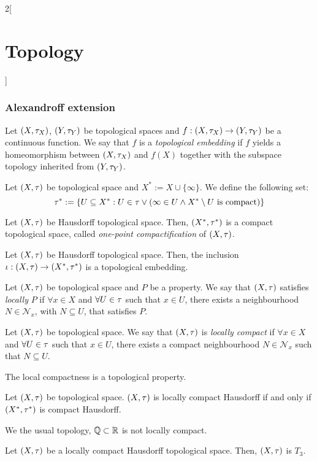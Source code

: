 \documentclass[../../../main.tex]{subfiles}
\begin{document}
\begin{multicols}{2}[\section{Topology}]
  \subsubsection{Alexandroff extension}
  \begin{definition}
    Let $(X,\tau_X)$, $(Y,\tau_Y)$ be topological spaces and $f:(X,\tau_X)\rightarrow(Y,\tau_Y)$ be a continuous function. We say that $f$ is a \emph{topological embedding} if $f$ yields a homeomorphism between $(X,\tau_X)$ and $f(X)$ together with the subspace topology inherited from $(Y,\tau_Y)$.
  \end{definition}
  \begin{definition}
    Let $(X,\tau)$ be topological space and $X^*:=X\cup\{\infty\}$. We define the following set:
    $$\tau^*:=\{U\subseteq X^*:U\in\tau\lor(\infty\in U\land X^*\setminus U\text{ is compact})\}$$
  \end{definition}
  \begin{theorem}
    Let $(X,\tau)$ be Hausdorff topological space. Then, $(X^*,\tau^*)$ is a compact topological space, called \emph{one-point compactification} of $(X,\tau)$.
  \end{theorem}
  \begin{prop}
    Let $(X,\tau)$ be Hausdorff topological space. Then, the inclusion $\iota: (X,\tau)\rightarrow(X^*,\tau^*)$ is a topological embedding.
  \end{prop}
  \begin{definition}
    Let $(X,\tau)$ be topological space and $P$ be a property. We say that $(X,\tau)$ satisfies \emph{locally} $P$ if $\forall x\in X$ and $\forall U\in\tau$ such that $x\in U$, there exists a neighbourhood $N\in\mathcal{N}_x$, with $N\subseteq U$, that satisfies $P$.
  \end{definition}
  \begin{definition}
    Let $(X,\tau)$ be topological space. We say that $(X,\tau)$ is \emph{locally compact} if $\forall x\in X$ and $\forall U\in\tau$ such that $x\in U$, there exists a compact neighbourhood $N\in\mathcal{N}_x$ such that $N\subseteq U$.
  \end{definition}
  \begin{prop}
    The local compactness is a topological property.
  \end{prop}
  \begin{definition}
    Let $(X,\tau)$ be topological space. $(X,\tau)$ is locally compact Hausdorff if and only if $(X^*,\tau^*)$ is compact Hausdorff.
  \end{definition}
  \begin{prop}
    We the usual topology, $\mathbb{Q}\subset \mathbb{R}$ is not locally compact.
  \end{prop}
  \begin{theorem}
    Let $(X,\tau)$ be a locally compact Hausdorff topological space. Then, $(X,\tau)$ is $T_3$.
  \end{theorem}

\end{multicols}
\end{document}
